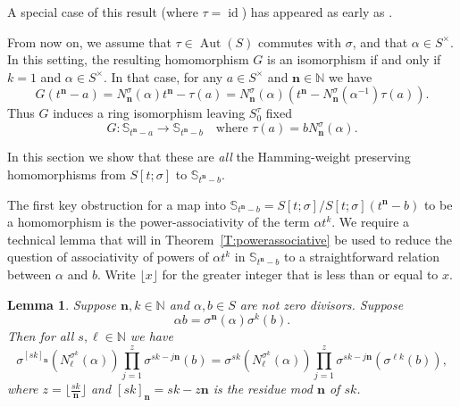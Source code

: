 \documentclass[11pt]{amsart}
\theoremstyle{plain}
\newtheorem{lemma}[theorem]{Lemma}
\theoremstyle{definition}
\numberwithin{equation}{section}
\numberwithin{figure}{section}
\newcommand{\Sone}[1]{\Stsigma/\Stsigma (t^{\de}-#1)} %
\newcommand{\Sonenew}[1]{\mathbb{S}_{t^\de-#1}}
\newcommand{\ring}{S}
\newcommand{\Stsigma}{S[t;\sigma]}
\newcommand{\fixedts}{S_0^\tau}
\DeclareMathOperator{\id}{id}
\newcommand{\de}{\mathbf{n}}  %
\newcommand{\N}{\mathbb{N}}
\DeclareMathOperator{\Aut}{Aut}
\begin{document}
A special case of this result (where $\tau=\id$) has appeared as early as \cite[Theorem 3]{Rimmer1978}.

From now on, we assume that $\tau\in \Aut(\ring)$ commutes with $\sigma$, and that $\alpha \in \ring^\times$.
In this setting, the resulting homomorphism $G$ is an isomorphism if and only if $k=1$ and $\alpha \in \ring^\times$.  In that case, for any $a\in \ring^\times$ and $\de\in \N$ we have
$$
G(t^{\de}-a) = N^\sigma_{\de}(\alpha)t^{\de}-\tau(a) = N^\sigma_{\de}(\alpha)(t^{\de} - N^\sigma_{\de}(\alpha^{-1})\tau(a)).
$$
Thus $G$ induces a ring isomorphism leaving $\fixedts$ fixed 
$$
G : \Sonenew{a} \to \Sonenew{b} \quad \text{where $\tau(a)= bN^\sigma_{\de}(\alpha)$.}
$$

In this section we show that these are \emph{all} the  Hamming-weight preserving homomorphisms from $\Stsigma$ to $\Sonenew{b}$.

The first key obstruction for a map into $\Sonenew{b}=\Sone{b}$ to be a homomorphism is the power-associativity of the term $\alpha t^k$.  We require a technical lemma that will in Theorem~\ref{T:powerassociative} be used to reduce the question of associativity of powers of $\alpha t^k$ in $\Sonenew{b}$ to a straightforward relation between $\alpha$ and $b$.  Write $\lfloor x \rfloor$ for the greater integer that is less than or equal to $x$.


\begin{lemma}\label{L:keystep}
    Suppose $\de,k\in \mathbb{N}$ and $\alpha,b\in \ring$ are not zero divisors.  Suppose
\begin{equation}\label{E:conditiononassociativity}
    \alpha b = \sigma^{\de}(\alpha) \sigma^k(b).
    \end{equation}
    Then for all $s,\ell\in \mathbb{N}$ we have
    \begin{equation}\label{E:keyequality}
\sigma^{[sk]_{\de}}
(N_{\ell}^{\sigma^k}(\alpha))
\prod_{j=1}^z\sigma^{sk-j{\de}}(b) =
\sigma^{sk}
(N_{\ell}^{\sigma^k}(\alpha))
\prod_{j=1}^z\sigma^{sk-j{\de}}
(\sigma^{\ell k}(b)),
    \end{equation}
    where $z= \lfloor \frac{sk}{{\de}}\rfloor$ and $[sk]_{\de}=sk-z{\de}$ is the residue mod ${\de}$ of $sk$.
\end{lemma}
\end{document}
